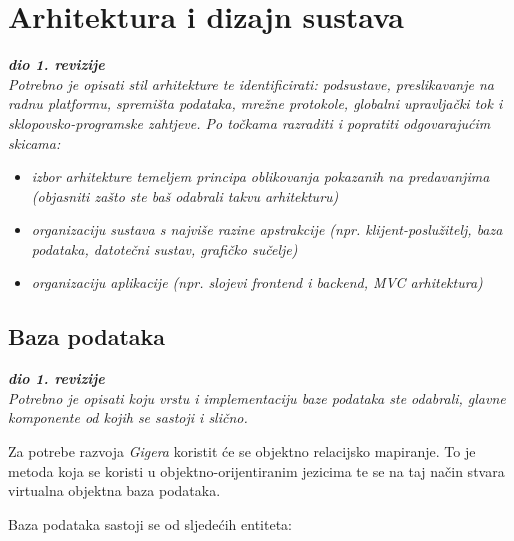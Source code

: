 \chapter{Arhitektura i dizajn sustava}
		
		\textbf{\textit{dio 1. revizije}}\\

		\textit{ Potrebno je opisati stil arhitekture te identificirati: podsustave, preslikavanje na radnu platformu, spremišta podataka, mrežne protokole, globalni upravljački tok i sklopovsko-programske zahtjeve. Po točkama razraditi i popratiti odgovarajućim skicama:}
	\begin{itemize}
		\item 	\textit{izbor arhitekture temeljem principa oblikovanja pokazanih na predavanjima (objasniti zašto ste baš odabrali takvu arhitekturu)}
		\item 	\textit{organizaciju sustava s najviše razine apstrakcije (npr. klijent-poslužitelj, baza podataka, datotečni sustav, grafičko sučelje)}
		\item 	\textit{organizaciju aplikacije (npr. slojevi frontend i backend, MVC arhitektura) }		
	\end{itemize}
	
				
		\section{Baza podataka}
			
			\textbf{\textit{dio 1. revizije}}\\
			
		\textit{Potrebno je opisati koju vrstu i implementaciju baze podataka ste odabrali, glavne komponente od kojih se sastoji i slično.}
		
		Za potrebe razvoja \textit{Gigera} koristit će se objektno relacijsko mapiranje. To je metoda koja se koristi u objektno-orijentiranim jezicima te se na taj način stvara virtualna objektna baza podataka.
		
		Baza podataka sastoji se od sljedećih entiteta:
		
